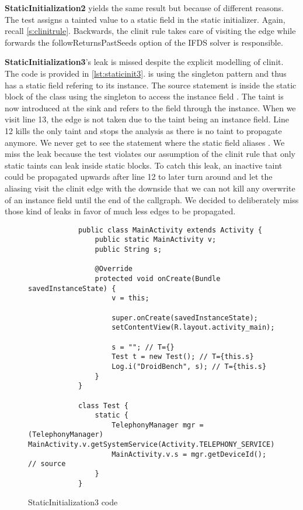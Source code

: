 \documentclass[../draft.tex]{subfiles}
\begin{document}
    \textbf{StaticInitialization2} yields the same result but because of different reasons. The test assigns a tainted value to a static field in the static initializer. Again, recall \autoref{s:clinitrule}. Backwards, the clinit rule takes care of visiting the  edge while forwards the followReturnsPastSeeds option of the IFDS solver is responsible. 

    \textbf{StaticInitialization3}'s leak is missed despite the explicit modelling of clinit. The code is provided in \autoref{lst:staticinit3}.  is using the singleton pattern and thus has a static field  refering to its instance. The source statement is inside the static block of the  class using the singleton to access the instance field .
    The taint is now introduced at the sink and refers to the field through the  instance. When we visit line 13, the  edge is not taken due to the taint being an instance field. Line 12 kills the only taint and stops the analysis as there is no taint to propagate anymore. We never get to see the statement where the static field  aliases . 
    We miss the leak because the test violates our assumption of the clinit rule that only static taints can leak inside static blocks. To catch this leak, an inactive taint could be propagated upwards after line 12 to later turn around and let the aliasing visit the clinit edge with the downside that we can not kill any overwrite of an instance field until the end of the callgraph. We decided to deliberately miss those kind of leaks in favor of much less edges to be propagated.
    
    \begin{figure}
        \begin{lstlisting}
            public class MainActivity extends Activity {
                public static MainActivity v;
                public String s;

                @Override
                protected void onCreate(Bundle savedInstanceState) {
                    v = this;
                
                    super.onCreate(savedInstanceState);
                    setContentView(R.layout.activity_main);
                
                    s = ""; // T={}
                    Test t = new Test(); // T={this.s}
                    Log.i("DroidBench", s); // T={this.s}
                }
            }

            class Test {
                static {
                    TelephonyManager mgr = (TelephonyManager) MainActivity.v.getSystemService(Activity.TELEPHONY_SERVICE);
                    MainActivity.v.s = mgr.getDeviceId(); // source
                }    
            }
        \end{lstlisting}
        \caption{StaticInitialization3 code}
        \label{lst:staticinit3}
    \end{figure}
\end{document}
